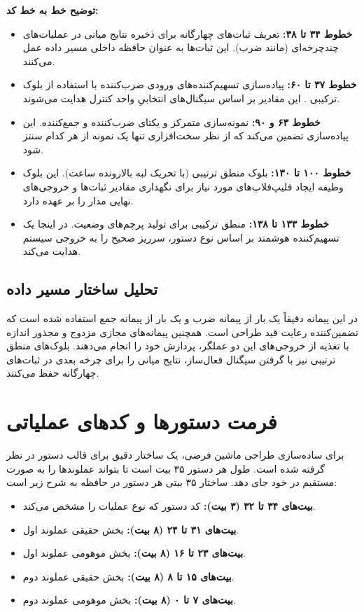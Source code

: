 \documentclass[11pt,a4paper]{article}
\begin{document}
\textbf{توضیح خط به خط کد:}
\begin{itemize}
    \item \textbf{خطوط ۳۴ تا ۳۸:} تعریف ثبات‌های چهارگانه برای ذخیره نتایج میانی در عملیات‌های چندچرخه‌ای (مانند ضرب). این ثبات‌ها به عنوان حافظه داخلی مسیر داده عمل می‌کنند.
    \item \textbf{خطوط ۳۷ تا ۶۰:} پیاده‌سازی تسهیم‌کننده‌های ورودی ضرب‌کننده با استفاده از بلوک ترکیبی . این مقادیر بر اساس سیگنال‌های انتخابیِ واحد کنترل هدایت می‌شوند.
    \item \textbf{خطوط ۶۳ و ۹۰:} نمونه‌سازی متمرکز و یکتای ضرب‌کننده و جمع‌کننده. این پیاده‌سازی تضمین می‌کند که از نظر سخت‌افزاری تنها یک نمونه از هر کدام سنتز شود.
    \item \textbf{خطوط ۱۰۰ تا ۱۳۰:} بلوک منطق ترتیبی (با تحریک لبه بالارونده ساعت). این بلوک وظیفه ایجاد فلیپ‌فلاپ‌های مورد نیاز برای نگهداری مقادیر ثبات‌ها و خروجی‌های نهایی مدار را بر عهده دارد.
    \item \textbf{خطوط ۱۳۳ تا ۱۳۸:} منطق ترکیبی برای تولید پرچم‌های وضعیت. در اینجا یک تسهیم‌کننده هوشمند بر اساس نوع دستور، سرریز صحیح را به خروجی سیستم هدایت می‌کند.
\end{itemize}

\subsection{تحلیل ساختار مسیر داده}
در این پیمانه دقیقاً یک بار از پیمانه ضرب و یک بار از پیمانه جمع استفاده شده است که تضمین‌کننده رعایت قید طراحی است. همچنین پیمانه‌های مجازی مزدوج و مجذور اندازه با تغذیه از خروجی‌های این دو عملگر، پردازش خود را انجام می‌دهند. بلوک‌های منطق ترتیبی نیز با گرفتن سیگنال فعال‌ساز، نتایج میانی را برای چرخه بعدی در ثبات‌های چهارگانه حفظ می‌کنند.

\section{فرمت دستورها و کدهای عملیاتی}
برای ساده‌سازی طراحی ماشین فرضی، یک ساختار دقیق برای قالب دستور در نظر گرفته شده است. طول هر دستور ۳۵ بیت است تا بتواند عملوندها را به صورت مستقیم در خود جای دهد. ساختار ۳۵ بیتی هر دستور در حافظه به شرح زیر است:
\begin{itemize}
    \item \textbf{بیت‌های ۳۴ تا ۳۲ (۳ بیت):} کد دستور که نوع عملیات را مشخص می‌کند.
    \item \textbf{بیت‌های ۳۱ تا ۲۴ (۸ بیت):} بخش حقیقی عملوند اول.
    \item \textbf{بیت‌های ۲۳ تا ۱۶ (۸ بیت):} بخش موهومی عملوند اول.
    \item \textbf{بیت‌های ۱۵ تا ۸ (۸ بیت):} بخش حقیقی عملوند دوم.
    \item \textbf{بیت‌های ۷ تا ۰ (۸ بیت):} بخش موهومی عملوند دوم.
\end{itemize}
\end{document}
